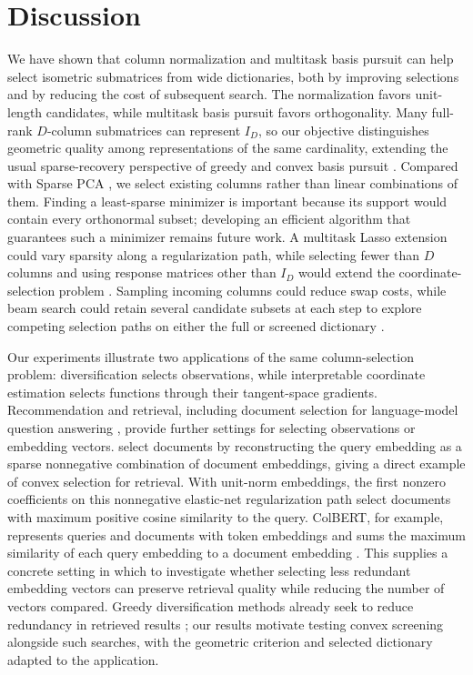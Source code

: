 \section{Discussion}
\label{sec:discussion}

We have shown that column normalization and multitask basis pursuit can help select isometric submatrices from wide dictionaries, both by improving selections and by reducing the cost of subsequent search.
The normalization favors unit-length candidates, while multitask basis pursuit favors orthogonality.
Many full-rank $D$-column submatrices can represent $I_D$, so our objective distinguishes geometric quality among representations of the same cardinality, extending the usual sparse-recovery perspective of greedy and convex basis pursuit \citep{Mallat93-wi, Tropp05-ml, Chen2001-hh, Tropp06-sg}.
Compared with Sparse PCA \citep{DAspremont2007-aq, Dey2017-mx, Bertsimas2022-qo, Bertsimas2022-dv}, we select existing columns rather than linear combinations of them.
Finding a least-sparse minimizer is important because its support would contain every orthonormal subset; developing an efficient algorithm that guarantees such a minimizer remains future work.
A multitask Lasso extension could vary sparsity along a regularization path, while selecting fewer than $D$ columns and using response matrices other than $I_D$ would extend the coordinate-selection problem \citep{Hastie2015-qa, Mishkin2022-yf}.
Sampling incoming columns could reduce swap costs, while beam search could retain several candidate subsets at each step to explore competing selection paths on either the full or screened dictionary \citep{Zou2024-swap, Fraiman2022-beam}.

Our experiments illustrate two applications of the same column-selection problem: diversification selects observations, while interpretable coordinate estimation selects functions through their tangent-space gradients.
Recommendation and retrieval, including document selection for language-model question answering \citep{Chen2024-esrag}, provide further settings for selecting observations or embedding vectors.
\citet{Okajima2026-nnn} select documents by reconstructing the query embedding as a sparse nonnegative combination of document embeddings, giving a direct example of convex selection for retrieval.
With unit-norm embeddings, the first nonzero coefficients on this nonnegative elastic-net regularization path select documents with maximum positive cosine similarity to the query.
ColBERT, for example, represents queries and documents with token embeddings and sums the maximum similarity of each query embedding to a document embedding \citep{Khattab2020-colbert}.
This supplies a concrete setting in which to investigate whether selecting less redundant embedding vectors can preserve retrieval quality while reducing the number of vectors compared.
Greedy diversification methods already seek to reduce redundancy in retrieved results \citep{Carbonell1998-ji}; our results motivate testing convex screening alongside such searches, with the geometric criterion and selected dictionary adapted to the application.
